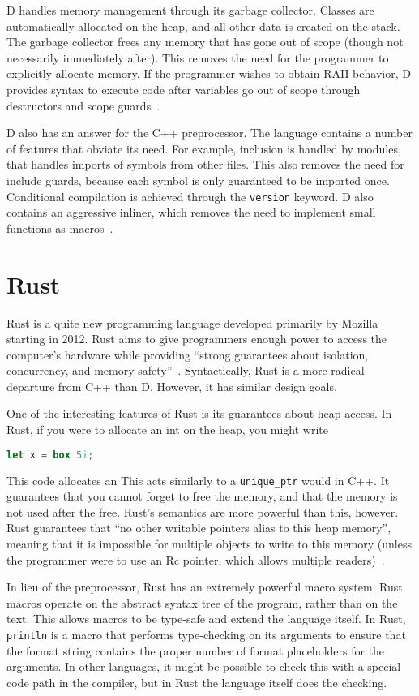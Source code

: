 \documentclass[finalcopy,short]{srpaper}
\begin{document}
D handles memory management through its garbage collector. Classes are
automatically allocated on the heap, and all other data is created on the
stack. The garbage collector frees any memory that has gone out of scope
(though not necessarily immediately after). This removes the need for the
programmer to explicitly allocate memory. If the programmer wishes to obtain
RAII behavior, D provides syntax to execute code after variables go out of
scope through destructors and scope guards~\cite{cppford}.

D also has an answer for the C++ preprocessor. The language contains a number
of features that obviate its need. For example, inclusion is handled by
modules, that handles imports of symbols from other files. This also removes
the need for include guards, because each symbol is only guaranteed to be
imported once. Conditional compilation is achieved through the
\texttt{version} keyword. D also contains an aggressive inliner, which removes
the need to implement small functions as macros~\cite{pretod}.

\section{Rust}

Rust is a quite new programming language developed primarily by Mozilla
starting in 2012. Rust aims to give programmers enough power to access the
computer's hardware while providing ``strong guarantees about isolation,
concurrency, and memory safety''~\cite{Matsakis:2014:RL:2663171.2663188}.
Syntactically, Rust is a more radical departure from C++ than D. However, it
has similar design goals.

One of the interesting features of Rust is its guarantees about heap access.
In Rust, if you were to allocate an int on the heap, you might write

\begin{lstlisting}[language=Rust]
    let x = box 5i;
\end{lstlisting}

This code allocates an This acts similarly to a \texttt{unique\_ptr} would in C++. It guarantees that
you cannot forget to free the memory, and that the memory is not used after
the free. Rust's semantics are more powerful than this, however. Rust
guarantees that ``no other writable pointers alias to this heap memory'',
meaning that it is impossible for multiple objects to write to this memory
(unless the programmer were to use an Rc pointer, which allows multiple
readers)~\cite{RustPointerGuide}.

In lieu of the preprocessor, Rust has an extremely powerful macro system.
Rust macros operate on the abstract syntax tree of the program, rather than on
the text. This allows macros to be type-safe and extend the language itself.
In Rust, \texttt{println} is a macro that performs type-checking on its
arguments to ensure that the format string contains the proper number of
format placeholders for the arguments. In other languages, it might be
possible to check this with a special code path in the compiler, but in Rust
the language itself does the checking.

\nocite{*}

\end{document}
